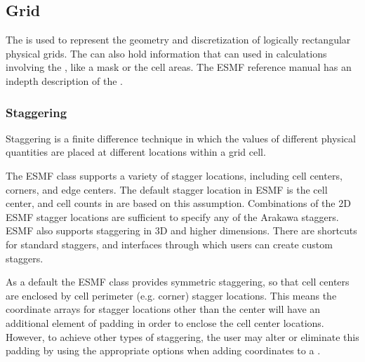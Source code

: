 \documentclass[letterpaper,10pt,english]{sphinxmanual}
\begin{document}
\subsection{Grid}
\label{\detokenize{api:grid}}
The {\hyperref[\detokenize{grid:ESMF.api.grid.Grid}]{}} is used to represent the geometry and discretization of logically
rectangular physical grids. The {\hyperref[\detokenize{grid:ESMF.api.grid.Grid}]{}} can also hold information that can used in
calculations involving the {\hyperref[\detokenize{grid:ESMF.api.grid.Grid}]{}}, like a mask or the cell areas. The ESMF reference
manual has an in\sphinxhyphen{}depth description of the
.


\subsubsection{Staggering}
\label{\detokenize{api:staggering}}
Staggering is a finite difference technique in which the values of different
physical quantities are placed at different locations within a grid cell.

The ESMF {\hyperref[\detokenize{grid:ESMF.api.grid.Grid}]{}} class supports a variety of stagger locations, including cell
centers, corners, and edge centers. The default stagger location in ESMF is the
cell center, and cell counts in {\hyperref[\detokenize{grid:ESMF.api.grid.Grid}]{}} are based on this assumption. Combinations
of the 2D ESMF stagger locations are sufficient to specify any of the Arakawa
staggers. ESMF also supports staggering in 3D and higher dimensions. There are
shortcuts for standard staggers, and interfaces through which users can create
custom staggers.

As a default the ESMF {\hyperref[\detokenize{grid:ESMF.api.grid.Grid}]{}} class provides symmetric staggering, so that cell
centers are enclosed by cell perimeter (e.g. corner) stagger locations. This
means the coordinate arrays for stagger locations other than the center will
have an additional element of padding in order to enclose the cell center
locations. However, to achieve other types of staggering, the user may alter or
eliminate this padding by using the appropriate options when adding coordinates
to a {\hyperref[\detokenize{grid:ESMF.api.grid.Grid}]{}}.
\end{document}
